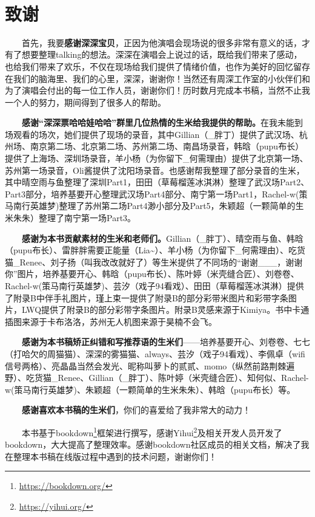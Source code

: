 \documentclass[]{ctexbook}
\renewcommand{\href}[2]{#2\footnote{\url{#1}}}
\begin{document}
  

\newpage

\section*{致谢}\label{Acknowledgments}


  首先，我要\textbf{感谢深深宝贝}，正因为他演唱会现场说的很多非常有意义的话，才有了想要整理talking的想法。深深在演唱会上说过的话，既给我们带来了感动，也给我们带来了欢乐，不仅在现场给我们提供了情绪价值，也作为美好的回忆留存在我们的脑海里、我们的心里，深深，谢谢你！当然还有周深工作室的小伙伴们和为了演唱会付出的每一位工作人员，谢谢你们！历时数月完成本书稿，当然不止我一个人的努力，期间得到了很多人的帮助。

  \textbf{感谢``深深票哈哈娃哈哈''群里几位热情的生米给我提供的帮助。}在我未能到场观看的场次，她们提供了现场的录音，其中Gillian（\_胖丁）提供了武汉场、杭州场、南京第二场、北京第二场、苏州第二场、南昌场录音，韩晗（pupu布长）提供了上海场、深圳场录音，羊小杨（为你留下\_何需理由）提供了北京第一场、苏州第一场录音，Oli酱提供了沈阳场录音。也感谢帮我整理了部分录音的生米，其中晴空雨与鱼整理了深圳Part1，田田（草莓榴莲冰淇淋）整理了武汉场Part2、Part3部分，培养基要开心整理武汉场Part4部分、南宁第一场Part1，Rachel-w(策马南行英雄梦)整理了苏州第二场Part4渺小部分及Part5，朱颖超（一颗简单的生米朱朱）整理了南宁第一场Part3。

  \textbf{感谢为本书贡献素材的生米和老师们。}Gillian（\_胖丁）、晴空雨与鱼、韩晗（pupu布长）、雷胖胖需要正能量（Lia\textasciitilde）、羊小杨（为你留下\_何需理由）、吃货猫\_Renee、刘子扬（叫我改改就好了）等生米提供了不同场的``谢谢\_\_\_，谢谢你''图片，培养基要开心、韩晗（pupu布长）、陈叶婷（米壳缝合匠）、刘卷卷、Rachel-w(策马南行英雄梦)、芸汐（戏子94看戏）、田田（草莓榴莲冰淇淋）提供了附录B中伴手礼图片，瑾上束一提供了附录B的部分彩带米图片和彩带字条图片，LWQ提供了附录B的部分彩带字条图片。附录B灵感来源于Kimiya。书中卡通插图来源于卡布洛洛，苏州无人机图来源于昊楠不会飞。

  \textbf{感谢为本书稿矫正纠错和写推荐语的生米们}------培养基要开心、刘卷卷、七七（打哈欠的周猫猫）、深深的雾猫猫、always、芸汐（戏子94看戏）、李佩卓（wifi信号两格）、亮晶晶当然会发光、昵称叫萝卜的贰贰、momo（纵然前路荆棘遍野）、吃货猫\_Renee、Gillian（\_胖丁）、陈叶婷（米壳缝合匠）、知何似、Rachel-w(策马南行英雄梦)、朱颖超（一颗简单的生米朱朱）、韩晗（pupu布长）等。

  \textbf{感谢喜欢本书稿的生米们}，你们的喜爱给了我非常大的动力！

  本书基于\href{https://bookdown.org/}{bookdown}框架进行撰写，感谢\href{https://yihui.org/}{Yihui}及相关开发人员开发了bookdown，大大提高了整理效率。感谢bookdown社区成员的相关文档，解决了我在整理本书稿在线版过程中遇到的技术问题，谢谢你们！
\end{document}
